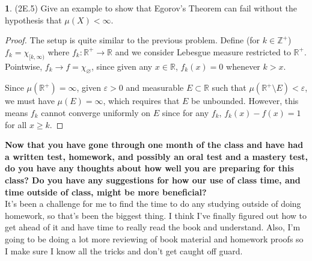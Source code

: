 \documentclass[12pt]{article}
\theoremstyle{definition}
\newtheorem{ex}{}
\begin{document}
\begin{ex}
	(2E.5)
	Give an example to show that Egorov's Theorem can fail without the hypothesis that $\mu(X) < \infty$.
\end{ex}
\begin{proof}
	The setup is quite similar to the previous problem.
	Define (for $k \in \mathbb{Z}^+$) $f_k = \chi_{[k,\infty)}$ where $f_k : \mathbb{R}^+ \to \mathbb{R}$ and we consider Lebesgue measure restricted to $\mathbb{R}^+$.
	Pointwise, $f_k \to f = \chi_\varnothing$, since given any $x \in \mathbb{R}$, $f_k(x) = 0$ whenever $k > x$.

	Since $\mu(\mathbb{R}^+) = \infty$, given $\varepsilon > 0$ and measurable $E \subset \mathbb{R}$ such that $\mu(\mathbb{R}^+ \setminus E) < \varepsilon$, we must have $\mu(E) = \infty$, which requires that $E$ be unbounded.
	However, this means $f_k$ cannot converge uniformly on $E$ since for any $f_k$, $f_k(x) - f(x) = 1$ for all $x \geq k$.
\end{proof}

\textbf{Now that you have gone through one month of the class and have had a written test, homework, and possibly an oral test and a mastery test, do you have any thoughts about how well you are preparing for this class? Do you have any suggestions for how our use of class time, and time outside of class, might be more beneficial?}\\
It's been a challenge for me to find the time to do any studying outside of doing homework, so that's been the biggest thing.
I think I've finally figured out how to get ahead of it and have time to really read the book and understand.
Also, I'm going to be doing a lot more reviewing of book material and homework proofs so I make sure I know all the tricks and don't get caught off guard.
\\\\
\end{document}
